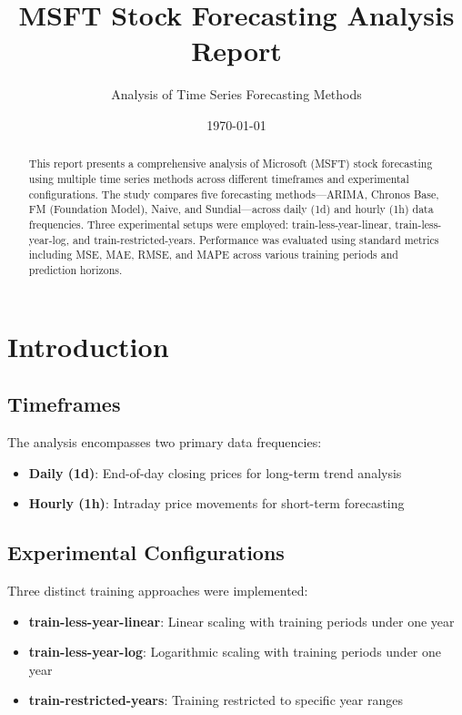 \documentclass{article}
\title{MSFT Stock Forecasting Analysis Report}
\author{Analysis of Time Series Forecasting Methods}
\date{\today}
\begin{document}
\maketitle

\begin{abstract}
This report presents a comprehensive analysis of Microsoft (MSFT) stock forecasting using multiple time series methods across different timeframes and experimental configurations. The study compares five forecasting methods—ARIMA, Chronos Base, FM (Foundation Model), Naive, and Sundial—across daily (1d) and hourly (1h) data frequencies. Three experimental setups were employed: train-less-year-linear, train-less-year-log, and train-restricted-years. Performance was evaluated using standard metrics including MSE, MAE, RMSE, and MAPE across various training periods and prediction horizons.
\end{abstract}

\tableofcontents
\newpage

\section{Introduction}

\subsection{Timeframes}
The analysis encompasses two primary data frequencies:
\begin{itemize}
\item \textbf{Daily (1d)}: End-of-day closing prices for long-term trend analysis
\item \textbf{Hourly (1h)}: Intraday price movements for short-term forecasting
\end{itemize}

\subsection{Experimental Configurations}
Three distinct training approaches were implemented:
\begin{itemize}
\item \textbf{train-less-year-linear}: Linear scaling with training periods under one year
\item \textbf{train-less-year-log}: Logarithmic scaling with training periods under one year
\item \textbf{train-restricted-years}: Training restricted to specific year ranges
\end{itemize}
\end{document}
